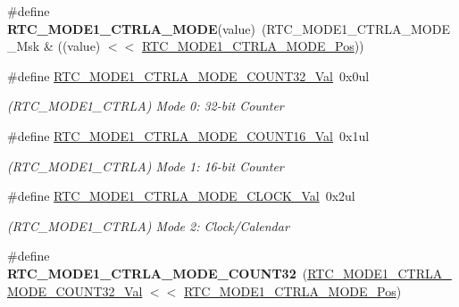 \begin{DoxyCompactItemize}
\item 
\hypertarget{group___s_a_m_l21___r_t_c_ga6650461e0b80c9e29a442229971e3690}{}\#define {\bfseries R\+T\+C\+\_\+\+M\+O\+D\+E1\+\_\+\+C\+T\+R\+L\+A\+\_\+\+M\+O\+D\+E}(value)~(R\+T\+C\+\_\+\+M\+O\+D\+E1\+\_\+\+C\+T\+R\+L\+A\+\_\+\+M\+O\+D\+E\+\_\+\+Msk \& ((value) $<$$<$ \hyperlink{group___s_a_m_l21___r_t_c_ga486afe45119b2d94182c02820cb6f4a7}{R\+T\+C\+\_\+\+M\+O\+D\+E1\+\_\+\+C\+T\+R\+L\+A\+\_\+\+M\+O\+D\+E\+\_\+\+Pos}))\label{group___s_a_m_l21___r_t_c_ga6650461e0b80c9e29a442229971e3690}

\item 
\hypertarget{group___s_a_m_l21___r_t_c_ga543da3b02c92e64d6f684a05a9369de9}{}\#define \hyperlink{group___s_a_m_l21___r_t_c_ga543da3b02c92e64d6f684a05a9369de9}{R\+T\+C\+\_\+\+M\+O\+D\+E1\+\_\+\+C\+T\+R\+L\+A\+\_\+\+M\+O\+D\+E\+\_\+\+C\+O\+U\+N\+T32\+\_\+\+Val}~0x0ul\label{group___s_a_m_l21___r_t_c_ga543da3b02c92e64d6f684a05a9369de9}

\begin{DoxyCompactList}\small\item\em (R\+T\+C\+\_\+\+M\+O\+D\+E1\+\_\+\+C\+T\+R\+L\+A) Mode 0\+: 32-\/bit Counter \end{DoxyCompactList}\item 
\hypertarget{group___s_a_m_l21___r_t_c_ga5c7f33b205fba3ee8138bed3e6afae01}{}\#define \hyperlink{group___s_a_m_l21___r_t_c_ga5c7f33b205fba3ee8138bed3e6afae01}{R\+T\+C\+\_\+\+M\+O\+D\+E1\+\_\+\+C\+T\+R\+L\+A\+\_\+\+M\+O\+D\+E\+\_\+\+C\+O\+U\+N\+T16\+\_\+\+Val}~0x1ul\label{group___s_a_m_l21___r_t_c_ga5c7f33b205fba3ee8138bed3e6afae01}

\begin{DoxyCompactList}\small\item\em (R\+T\+C\+\_\+\+M\+O\+D\+E1\+\_\+\+C\+T\+R\+L\+A) Mode 1\+: 16-\/bit Counter \end{DoxyCompactList}\item 
\hypertarget{group___s_a_m_l21___r_t_c_ga3750f632507a11fd51820c5eadf2aa2d}{}\#define \hyperlink{group___s_a_m_l21___r_t_c_ga3750f632507a11fd51820c5eadf2aa2d}{R\+T\+C\+\_\+\+M\+O\+D\+E1\+\_\+\+C\+T\+R\+L\+A\+\_\+\+M\+O\+D\+E\+\_\+\+C\+L\+O\+C\+K\+\_\+\+Val}~0x2ul\label{group___s_a_m_l21___r_t_c_ga3750f632507a11fd51820c5eadf2aa2d}

\begin{DoxyCompactList}\small\item\em (R\+T\+C\+\_\+\+M\+O\+D\+E1\+\_\+\+C\+T\+R\+L\+A) Mode 2\+: Clock/\+Calendar \end{DoxyCompactList}\item 
\hypertarget{group___s_a_m_l21___r_t_c_gae6555904481dade71d2f914c80b00b86}{}\#define {\bfseries R\+T\+C\+\_\+\+M\+O\+D\+E1\+\_\+\+C\+T\+R\+L\+A\+\_\+\+M\+O\+D\+E\+\_\+\+C\+O\+U\+N\+T32}~(\hyperlink{group___s_a_m_l21___r_t_c_ga543da3b02c92e64d6f684a05a9369de9}{R\+T\+C\+\_\+\+M\+O\+D\+E1\+\_\+\+C\+T\+R\+L\+A\+\_\+\+M\+O\+D\+E\+\_\+\+C\+O\+U\+N\+T32\+\_\+\+Val} $<$$<$ \hyperlink{group___s_a_m_l21___r_t_c_ga486afe45119b2d94182c02820cb6f4a7}{R\+T\+C\+\_\+\+M\+O\+D\+E1\+\_\+\+C\+T\+R\+L\+A\+\_\+\+M\+O\+D\+E\+\_\+\+Pos})\label{group___s_a_m_l21___r_t_c_gae6555904481dade71d2f914c80b00b86}


\end{DoxyCompactItemize}

